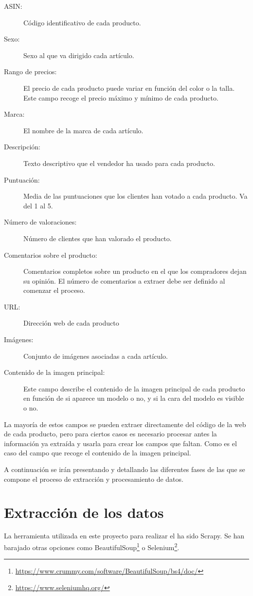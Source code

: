 \begin{description}
    \item[ASIN:] Código identificativo de cada producto.
    \item[Sexo:] Sexo al que va dirigido cada artículo.
    \item[Rango de precios:] El precio de cada producto puede variar en función del color o la talla. Este campo recoge el precio máximo y mínimo de cada producto.
    \item[Marca:] El nombre de la marca de cada artículo.
    \item[Descripción:] Texto descriptivo que el vendedor ha usado para cada producto.
    \item[Puntuación:] Media de las puntuaciones que los clientes han votado a cada producto. Va del 1 al 5.
    \item[Número de valoraciones:] Número de clientes que han valorado el producto.
    \item[Comentarios sobre el producto:] Comentarios completos sobre un producto en el que los compradores dejan su opinión. El número de comentarios a extraer debe ser definido al comenzar el proceso.
    \item[URL:] Dirección web de cada producto
    \item[Imágenes:] Conjunto de imágenes asociadas a cada artículo.
    \item[Contenido de la imagen principal:] Este campo describe el contenido de la imagen principal de cada producto en función de si aparece un modelo o no, y si la cara del modelo es visible o no.
\end{description}

La mayoría de estos campos se pueden extraer directamente del código  de la web de cada producto, pero para ciertos casos es necesario procesar antes la información ya extraída y usarla para crear los campos que faltan. Como es el caso del campo que recoge el contenido de la imagen principal.

A continuación se irán presentando y detallando las diferentes fases de las que se compone el proceso de extracción y procesamiento de datos.

\section{Extracción de los datos}

La herramienta utilizada en este proyecto para realizar el  ha sido Scrapy. Se han barajado otras opciones como BeautifulSoup\footnote{\url{https://www.crummy.com/software/BeautifulSoup/bs4/doc/}} o Selenium\footnote{\url{https://www.seleniumhq.org/}}.

